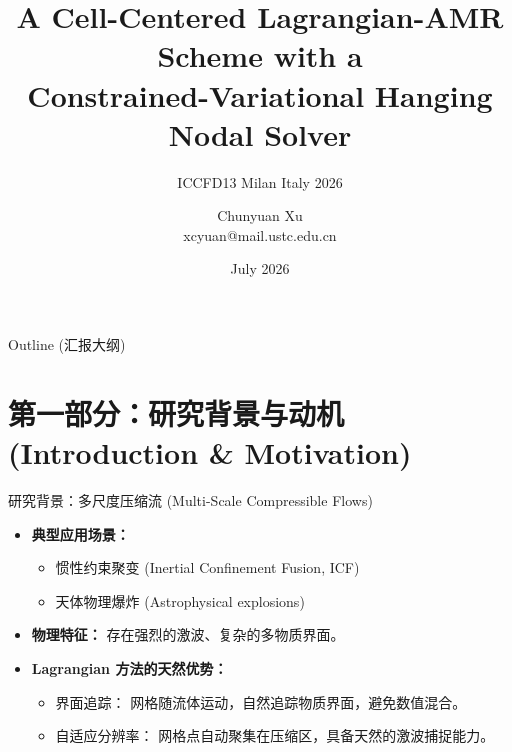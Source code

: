 \documentclass{beamer}
\author[Chunyuan Xu]{Chunyuan Xu \\ {\small xcyuan@mail.ustc.edu.cn}}
\title[Cell-Centered Lagrangian-AMR]{A Cell-Centered Lagrangian-AMR Scheme with a \\ Constrained-Variational Hanging Nodal Solver}
\subtitle{ICCFD13 Milan Italy 2026}
\institute[IAPCM]{Institute of Applied Physics and Computational Mathematics \\ Beijing, China}
\date{July 2026}
\begin{document}
	
	\kaishu
	
	\begin{frame}
		\titlepage
	\end{frame}
	
	\begin{frame}{Outline (汇报大纲)}
		\tableofcontents[hideallsubsections]
	\end{frame}
	
	\section{第一部分：研究背景与动机 (Introduction \& Motivation)}
	
	\begin{frame}{研究背景：多尺度压缩流 (Multi-Scale Compressible Flows)}
		\begin{itemize}
			\item \textbf{典型应用场景：}
			\begin{itemize}
				\item 惯性约束聚变 (Inertial Confinement Fusion, ICF)
				\item 天体物理爆炸 (Astrophysical explosions)
			\end{itemize}
			\item \textbf{物理特征：} 存在强烈的激波、复杂的多物质界面。
			\vspace{0.5cm}
			\item \textbf{Lagrangian 方法的天然优势：}
			\begin{itemize}
				\item \textcolor{deepblue}{界面追踪：} 网格随流体运动，自然追踪物质界面，避免数值混合。
				\item \textcolor{deepblue}{自适应分辨率：} 网格点自动聚集在压缩区，具备天然的激波捕捉能力。
			\end{itemize}
		\end{itemize}
	\end{frame}
	
\end{document}
